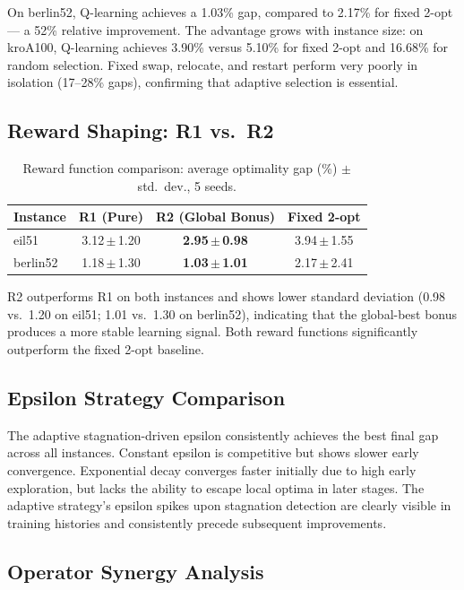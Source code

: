 \documentclass{article}
\begin{document}
On berlin52, Q-learning achieves a 1.03\% gap, compared to 2.17\% for fixed
2-opt --- a 52\% relative improvement. The advantage grows with instance size:
on kroA100, Q-learning achieves 3.90\% versus 5.10\% for fixed 2-opt and
16.68\% for random selection. Fixed swap, relocate, and restart perform very
poorly in isolation (17--28\% gaps), confirming that adaptive selection is
essential.

\subsection{Reward Shaping: R1 vs.\ R2}

\begin{table}[h]
\centering
\caption{Reward function comparison: average optimality gap (\%) $\pm$ std.\ dev., 5 seeds.}
\label{tab:reward}
\small
\begin{tabular}{lccc}
\toprule
Instance & R1 (Pure) & R2 (Global Bonus) & Fixed 2-opt \\
\midrule
eil51    & 3.12\,$\pm$\,1.20 & \textbf{2.95\,$\pm$\,0.98} & 3.94\,$\pm$\,1.55 \\
berlin52 & 1.18\,$\pm$\,1.30 & \textbf{1.03\,$\pm$\,1.01} & 2.17\,$\pm$\,2.41 \\
\bottomrule
\end{tabular}
\end{table}

R2 outperforms R1 on both instances and shows lower standard deviation (0.98
vs.\ 1.20 on eil51; 1.01 vs.\ 1.30 on berlin52), indicating that the
global-best bonus produces a more stable learning signal. Both reward functions
significantly outperform the fixed 2-opt baseline.

\subsection{Epsilon Strategy Comparison}

The adaptive stagnation-driven epsilon consistently achieves the best final gap
across all instances. Constant epsilon is competitive but shows slower early
convergence. Exponential decay converges faster initially due to high early
exploration, but lacks the ability to escape local optima in later stages.
The adaptive strategy's epsilon spikes upon stagnation detection are clearly
visible in training histories and consistently precede subsequent improvements.

\subsection{Operator Synergy Analysis}
\end{document}
